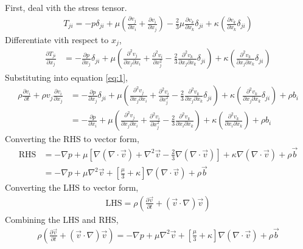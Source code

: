 \subsection{}
First, deal vith the stress tensor.
\begin{align*}
    T_{ji} = -p \delta_{ji} + \mu \left(\frac{\partial v_j}{\partial x_i} +
    \frac{\partial v_i}{\partial x_j} \right) - \frac{2}{3} \mu
    \frac{\partial v_k}{\partial x_k} \delta_{ji} + \kappa \left(
    \frac{\partial v_k}{\partial x_k} \delta_{ji} \right)
\end{align*}
Differentiate vith respect to $x_j$,
\begin{align*}
    \frac{\partial T_{ji}}{\partial x_j} &= -\frac{\partial p}{\partial x_j} \delta_{ji}
    + \mu \left(\frac{\partial^2 v_j}{\partial x_j \partial x_i} + 
    \frac{\partial^2 v_i}{\partial x_j^2} - 
    \frac{2}{3} \frac{\partial^2 v_k}{\partial x_j \partial x_k} \delta_{ji}\right) + 
    \kappa \left(\frac{\partial^2 v_k}{\partial x_j \partial x_k} \delta_{ji} \right)  
\end{align*}
Substituting into equation \ref{eq:1},
\begin{align*}
    \rho \frac{\partial v_i}{\partial t} + \rho v_j \frac{\partial v_i}{\partial x_j} 
    &= -\frac{\partial p}{\partial x_j} \delta_{ji}
    + \mu \left(\frac{\partial^2 v_j}{\partial x_j \partial x_i} + 
    \frac{\partial^2 v_i}{\partial x_j^2} - 
    \frac{2}{3} \frac{\partial^2 v_k}{\partial x_j \partial x_k} \delta_{ji}\right) + 
    \kappa \left(\frac{\partial^2 v_k}{\partial x_j \partial x_k} \delta_{ji} \right) + \rho b_i \\
    &= -\frac{\partial p}{\partial x_i} + \mu \left(\frac{\partial^2 v_j}{\partial x_j \partial x_i} +
    \frac{\partial^2 v_i}{\partial x_j^2} - \frac{2}{3} \frac{\partial^2 v_k}{\partial x_i \partial x_k} 
    \right) + \kappa \left(\frac{\partial^2 v_k}{\partial x_i \partial x_k} \right) + \rho b_i
\end{align*}
Converting the RHS to vector form,
\begin{align*}
    \text{RHS} &=
    -\nabla p + \mu \left[\nabla (\nabla \cdot \vec{v}) + \nabla^2 \vec{v} - 
    \frac{2}{3} \nabla (\nabla \cdot \vec{v}) \right] 
    + \kappa \nabla (\nabla \cdot \vec{v}) + \rho \vec{b} \\
    &= -\nabla p + \mu \nabla^2 \vec{v} 
    + \left[\frac{\mu}{3} + \kappa\right] \nabla (\nabla \cdot \vec{v}) + \rho \vec{b}
\end{align*}
Converting the LHS to vector form,
\begin{align*}
    \text{LHS} = \rho \left(\frac{\partial \vec{v}}{\partial t} 
    + (\vec{v} \cdot \nabla) \vec{v} \right)
\end{align*}
Combining the LHS and RHS,
\begin{align*}
    \boxed{
    \rho \left(\frac{\partial \vec{v}}{\partial t}
    + (\vec{v} \cdot \nabla) \vec{v} \right) = -\nabla p + \mu \nabla^2 \vec{v}
    + \left[\frac{\mu}{3} + \kappa\right] \nabla (\nabla \cdot \vec{v}) + \rho \vec{b}
    }
\end{align*}

